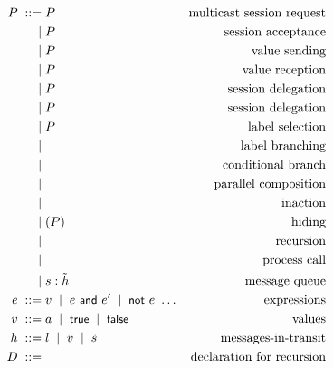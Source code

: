 \documentclass{article}
\begin{document}
\begin{align*}
  P \grmeq & \request asP                   & \text{multicast session request}\\
    \grmor & \accept asP                    & \text{session acceptance}\\
    \grmor & \send seP                      & \text{value sending}\\
    \grmor & \recv sxP                      & \text{value reception}\\
    \grmor & \hosend s{\VEC s}P             & \text{session delegation}\\
    \grmor & \horecv s{\VEC s}P             & \text{session delegation}\\
    \grmor & \select slP                    & \text{label selection}\\
    \grmor & \branch slP                    & \text{label branching}\\
    \grmor & \cond ePQ                      & \text{conditional branch}\\
    \grmor & \parcomp PQ                    & \text{parallel composition}\\
    \grmor & \inact                         & \text{inaction}\\
    \grmor & \restrict nP                   & \text{hiding}\\
    \grmor & \recur DP                      & \text{recursion}\\
    \grmor & \vars X{\VEC e}{\VEC s}        & \text{process call}\\
    \grmor & s: \VEC{h}                     & \text{message queue}\\
  e \grmeq & v \grmor e\ \andk\ e' \grmor \notk\ e\ \dots
                                            & \text{expressions}\\
  v \grmeq & a \grmor \truek \grmor \falsek & \text{values}\\
  h \grmeq & l \grmor \VEC{v} \grmor \VEC{s}& \text{messages-in-transit}\\
  D \grmeq & \declare X{\VEC x}{\VEC s}P    & \text{declaration for recursion}\\
\end{align*}
\end{document}

